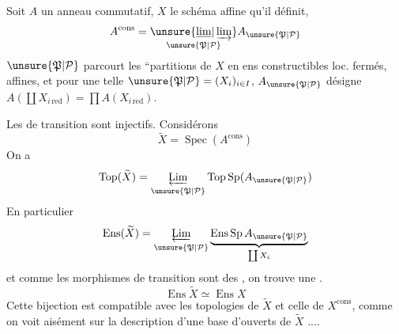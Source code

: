 Soit $A$ un anneau commutatif, $X$ le schéma affine qu'il définit,
\[
A^{\mathrm{cons}}=\underset{\unsure{\mathfrak P|\mathcal P}}{\unsure{\underline{\lim}|\varinjlim}} A_{\unsure{\mathfrak P|\mathcal P}}
\]
$\unsure{\mathfrak P|\mathcal P}$ parcourt les ``partitions  de $X$ en ens constructibles loc. fermés, affines, et pour une telle $\unsure{\mathfrak P|\mathcal P}=(X_i)_{i\in I}$, $A_{\unsure{\mathfrak P|\mathcal P}}$ désigne  $A(\coprod X_{i\,\mathrm{red}})=\prod A(X_{i\,\mathrm{red}})$.

Les  de transition sont injectifs. Considérons
\[
\widetilde X=\operatorname{Spec}(A^{\mathrm{cons}})
\]
On a
\[
\operatorname{Top}(\widetilde X)=\mathop{\underleftarrow{\mathrm{Lim}}}_{\unsure{\mathfrak P|\mathcal P}}\operatorname{Top}\operatorname{Sp}(A_{\unsure{\mathfrak P|\mathcal P}})
\]
En particulier
\[
\operatorname{Ens}(\widetilde X)=\mathop{\underleftarrow{\mathrm{Lim}}}_{\unsure{\mathfrak P|\mathcal P}}\underbrace{\operatorname{Ens}\operatorname{Sp}A_{\unsure{\mathfrak P|\mathcal P}}}_{\coprod X_i}
\]
et comme les morphismes de transition sont des  , on trouve  une  .
\[
\operatorname{Ens}\widetilde X\simeq\operatorname{Ens}X
\]
Cette bijection est compatible avec les topologies de $\widetilde X$ et celle de $X^{\mathrm{cons}}$, comme on voit aisément sur la description d'une base d'ouverts de $\widetilde X$ ....
